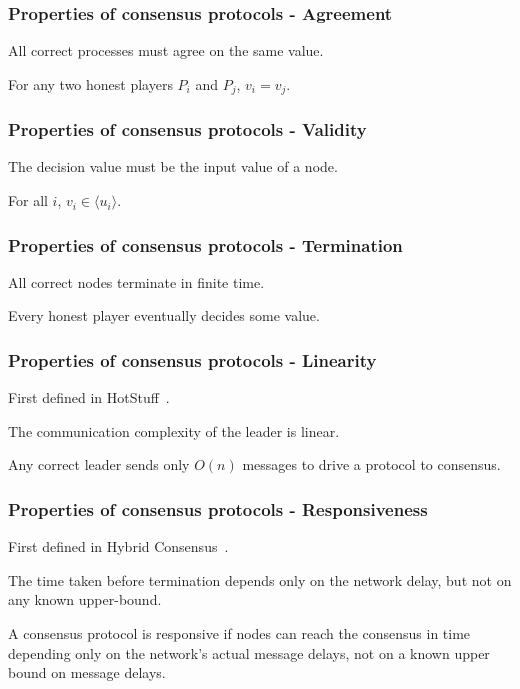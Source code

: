 \documentclass{beamer}
\begin{document}
\begin{frame}
\frametitle{Properties of consensus protocols - Agreement}

All correct processes must agree on the same value.

\begin{definition}[Agreement]
For any two honest players $P_i$ and $P_j$, $v_i = v_j$.
\end{definition}

\end{frame}


\begin{frame}
\frametitle{Properties of consensus protocols - Validity}

The decision value must be the input value of a node.

\begin{definition}[Validity]
For all $i$, $v_i \in \langle u_i \rangle$.
\end{definition}

\end{frame}


\begin{frame}
\frametitle{Properties of consensus protocols - Termination}

All correct nodes terminate in finite time.

\begin{definition}[Termination]
Every honest player eventually decides some value.
\end{definition}

\end{frame}



\begin{frame}
\frametitle{Properties of consensus protocols - Linearity}

First defined in HotStuff~\cite{yin2019hotstuff}.

The communication complexity of the leader is linear.

\begin{definition}[Linearity]
Any correct leader sends only $O(n)$ messages to drive a protocol to consensus.
\end{definition}



\end{frame}



\begin{frame}
\frametitle{Properties of consensus protocols - Responsiveness}

First defined in Hybrid Consensus~\cite{pass2017hybrid}.

The time taken before termination depends only on the network delay, but not on any known upper-bound.

\begin{definition}[Responsiveness]
A consensus protocol is responsive if nodes can reach the consensus in time depending only on the network’s actual message delays, not on a known upper bound on message delays.
\end{definition}

\end{frame}
\end{document}
